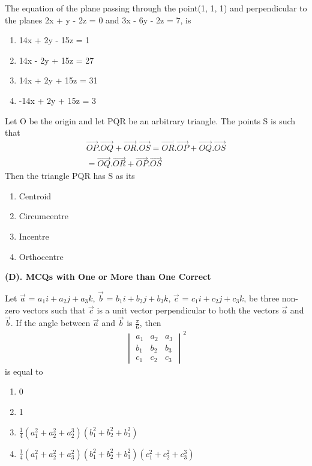 \item The equation of the plane passing through the point(1, 1, 1) and perpendicular to the planes 2x + y - 2z = 0 and 3x - 6y - 2z = 7, is
\begin{enumerate}
\item 14x + 2y - 15z = 1
\item 14x - 2y + 15z = 27
\item 14x + 2y + 15z = 31
\item -14x + 2y + 15z = 3
\end{enumerate}

\item Let O be the origin and let PQR be an arbitrary triangle. The points S is such that
\begin{align*}
\overrightarrow{OP}.\overrightarrow{OQ} + \overrightarrow{OR}.\overrightarrow{OS} = \overrightarrow{OR}.\overrightarrow{OP} + \overrightarrow{OQ}.\overrightarrow{OS}\\
 = \overrightarrow{OQ}.\overrightarrow{OR} + \overrightarrow{OP}.\overrightarrow{OS}
\end{align*}
Then the triangle PQR has S as its
\begin{enumerate}
\item Centroid
\item Circumcentre
\item Incentre
\item Orthocentre
\end{enumerate}

\textbf{(D). MCQs with One or More than One Correct}
\item Let $\overrightarrow{a}$ = $a_{1}i + a_{2}j + a_{3}k$, $\overrightarrow{b}$ = $b_{1}i + b_{2}j + b_{3}k$, $\overrightarrow{c}$ = $c_{1}i + c_{2}j + c_{3}k$, be three non-zero vectors such that $\overrightarrow{c}$ is a unit vector perpendicular to both the vectors $\overrightarrow{a}$ and $\overrightarrow{b}$. If the angle between $\overrightarrow{a}$ and $\overrightarrow{b}$ is $\frac{\pi}{6}$, then 
\begin{align*}
\begin{vmatrix} a_1 & a_2 & a_3 \\ b_1 & b_2 & b_3 \\ c_1 & c_2 & c_3  \end{vmatrix}^{2}
\end{align*}
is equal to
\begin{enumerate}
\item 0
\item 1
\item $\frac{1}{4}(a_1^{2} + a_2^{2} + a_2^{3})(b_1^{2} + b_2^{2} + b_3^{2})$
\item $\frac{1}{4}(a_1^{2} + a_2^{2} + a_3^{2})(b_1^{2} + b_2^{2} + b_3^{2})(c_1^{2} + c_2^{2} + c_3^{3})$
\end{enumerate}

